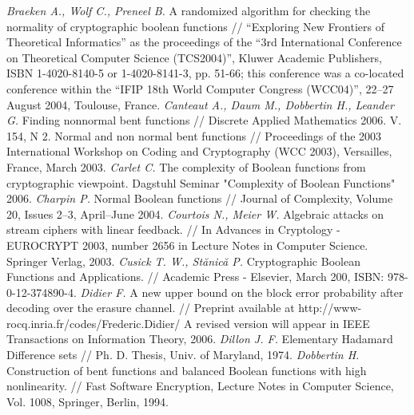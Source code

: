 \begin{thebibliography}{99}
 {\it Braeken A., Wolf C., Preneel B.} A randomized algorithm for checking the normality of cryptographic boolean functions // “Exploring New Frontiers of Theoretical Informatics” as the proceedings of the “3rd International Conference on Theoretical Computer Science (TCS2004)”, Kluwer Academic Publishers, ISBN 1-4020-8140-5 or 1-4020-8141-3, pp. 51-66; this conference was a co-located conference within the “IFIP 18th World Computer Congress (WCC04)”, 22–27 August 2004, Toulouse, France.
 {\it Canteaut A., Daum M., Dobbertin H., Leander G.} Finding nonnormal bent functions // Discrete Applied Mathematics 2006. V. 154, N 2.
 Normal and non normal bent functions // Proceedings of the 2003 International Workshop on Coding and Cryptography (WCC 2003), Versailles, France, March 2003.
 {\it Carlet C.} The complexity of Boolean functions from cryptographic viewpoint. Dagstuhl Seminar "Complexity of Boolean Functions" 2006.
 {\it Charpin P.} Normal Boolean functions // Journal of Complexity, Volume 20, Issues 2–3, April–June 2004.
 {\it Courtois N., Meier W.} Algebraic attacks on stream ciphers with linear feedback. // In Advances in Cryptology - EUROCRYPT 2003, number 2656 in Lecture Notes in Computer Science. Springer Verlag,  2003.
 {\it Cusick T. W., Stănică P.} Cryptographic Boolean Functions and Applications. // Academic Press - Elsevier, March 200, ISBN: 978-0-12-374890-4.
 {\it Didier F.} A new upper bound on the block error probability after decoding over the erasure channel. // Preprint available at http://www-rocq.inria.fr/codes/Frederic.Didier/ A revised version will appear in IEEE Transactions on Information Theory, 2006.
 {\it Dillon J. F.} Elementary Hadamard Difference sets // Ph. D. Thesis, Univ. of Maryland, 1974.
 {\it Dobbertin H.} Construction of bent functions and balanced Boolean functions with high nonlinearity. // Fast Software Encryption, Lecture Notes in Computer Science, Vol. 1008, Springer, Berlin, 1994.

\end{thebibliography}
